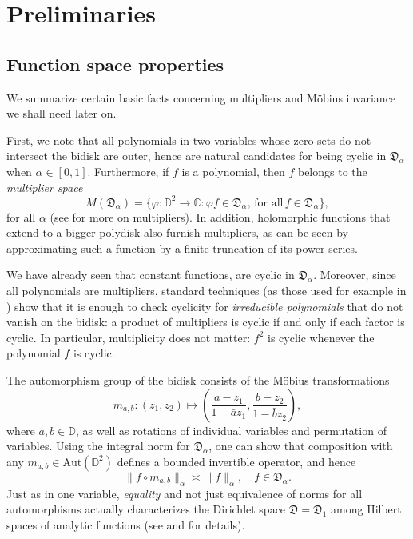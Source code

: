 \documentclass[11 pt,reqno]{amsart}
\theoremstyle{definition}
\theoremstyle{remark}
\numberwithin{equation}{section} \numberwithin{figure}{section}
\begin{document}
\section{Preliminaries}\label{prelim}
\subsection{Function space properties} \label{funcspaceprops} 

We summarize certain basic facts concerning multipliers and M\"obius
invariance we shall need later on.

First, we note that all polynomials in two variables whose zero sets
do not intersect the bidisk are outer, hence are natural candidates
for being cyclic in $\mathfrak{D}_{\alpha}$ when $\alpha \in [0,1]$.
Furthermore, if $f$ is a polynomial, then $f$ belongs to the {\it
  multiplier space}
\[M(\mathfrak{D}_{\alpha})=\{{\varphi}\colon \mathbb{D}^2\to
\mathbb{C}\colon {\varphi} f\in \mathfrak{D}_{\alpha}, \, \textrm{for
  all}\, f\in \mathfrak{D}_{\alpha}\},\] for all $\alpha$ (see
\cite{JR06} for more on multipliers). In addition, holomorphic
functions that extend to a bigger polydisk also furnish multipliers,
as can be seen by approximating such a function by a finite truncation
of its power series.

We have already seen that constant functions, are cyclic in
$\mathfrak{D}_{\alpha}$. Moreover, since all polynomials are
multipliers, standard techniques (as those used for example in
\cite[Proposition 8]{BS84}) show that it is enough to check cyclicity
for {\it irreducible polynomials} that do not vanish on the bidisk: a
product of multipliers is cyclic if and only if each factor is cyclic.
In particular, multiplicity does not matter: $f^2$ is cyclic whenever
the polynomial $f$ is cyclic.

The automorphism group of the
bidisk consists of the M\"obius transformations
\begin{equation}
m_{a,b}\colon(z_1,z_2)\mapsto \left(\frac{a-z_1}{1-\bar{a}z_1},\frac{b-z_2}{1-\bar{b}z_2}\right),
\label{mobmap}
\end{equation}
where $a,b\in {{\mathbb D}}$, as well as rotations of individual variables and
permutation of variables. Using the integral norm for ${\mathfrak{D}_{\alpha}}$, one can
show that composition with any $m_{a,b} \in
\mathrm{Aut}(\mathbb{D}^2)$ defines a bounded invertible operator, and
hence
\[\|f\circ m_{a,b}\|_{\alpha}\asymp \|f\|_{\alpha}, \quad f\in
\mathfrak{D}_{\alpha}.\] Just as in one variable, \emph{equality} and
not just equivalence of norms for all automorphisms actually
characterizes the Dirichlet space $\mathfrak{D}=\mathfrak{D}_1$ among
Hilbert spaces of analytic functions (see \cite{EKMRBook} and
\cite{Kap94} for details).
\end{document}
